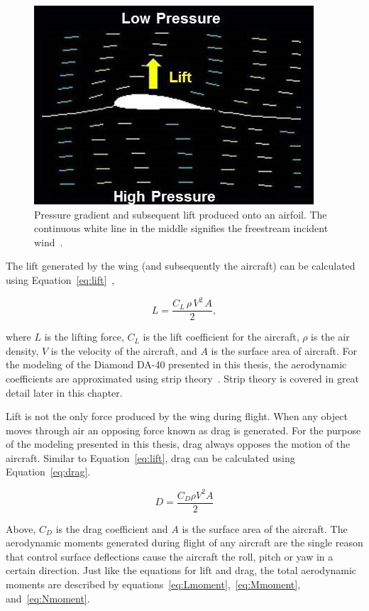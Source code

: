 \begin{figure}[!ht]
    \centering
    \includegraphics[width=0.75\linewidth]{Figures/foillift.jpg}
    \caption{Pressure gradient and subsequent lift produced onto an airfoil. The continuous white line in the middle signifies the freestream incident wind~\cite{WhatLift}.}\label{fig:pressuregradient}
\end{figure}

The lift generated by the wing (and subsequently the aircraft) can be calculated using Equation~\ref{eq:lift}~\cite{raymerAircraftDesignConceptual2018},

\begin{equation}\label{eq:lift}
    L = \frac{C_L \, \rho \, V^2 \, A}{2},
\end{equation}

where \(L\) is the lifting force, \(C_L\) is the lift coefficient for the aircraft, \( \rho \) is the air density, \(V\) is the velocity of the aircraft, and \(A\) is the surface area of aircraft. For the modeling of the Diamond DA-40 presented in this thesis, the aerodynamic coefficients are approximated using {strip theory}~\cite{cookStripTheoryApproach2021}. {Strip theory} is covered in great detail later in this chapter.

Lift is not the only force produced by the wing during flight. When any object moves through air an opposing force known as drag is generated. For the purpose of the modeling presented in this thesis, drag always opposes the motion of the aircraft. Similar to Equation~\ref{eq:lift}, drag can be calculated using Equation~\ref{eq:drag}.

\begin{equation}\label{eq:drag}
    D = \frac{C_D \rho V^2 A}{2}
\end{equation}

Above, \(C_D\) is the drag coefficient and \(A\) is the surface area of the aircraft. The aerodynamic moments generated during flight of any aircraft are the single reason that control surface deflections cause the aircraft the roll, pitch or yaw in a certain direction. Just like the equations for lift and drag, the total aerodynamic moments are described by equations~\ref{eq:Lmoment},~\ref{eq:Mmoment}, and~\ref{eq:Nmoment}.


